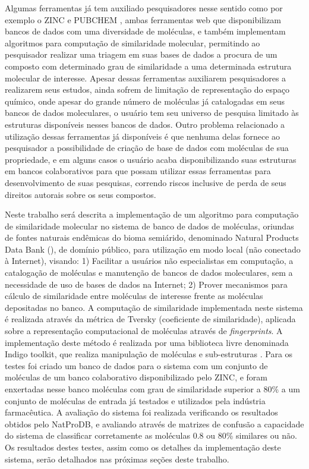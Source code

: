 Algumas ferramentas já tem auxiliado pesquisadores nesse sentido como por exemplo o ZINC \cite{irwin2005zinc} e PUBCHEM \cite{li2010pubchem}, ambas ferramentas web que disponibilizam bancos de dados com uma diversidade de moléculas, e também implementam algoritmos para computação de similaridade molecular, permitindo ao pesquisador realizar uma triagem em suas bases de dados a procura de um composto com determinado grau de similaridade a uma determinada estrutura molecular de interesse. Apesar dessas ferramentas auxiliarem pesquisadores a realizarem seus estudos, ainda sofrem de limitação de representação do espaço químico, onde apesar do grande número de moléculas já catalogadas em seus bancos de dados moleculares, o usuário tem seu universo de pesquisa limitado às estruturas disponíveis nesses bancos de dados. Outro problema relacionado a utilização dessas ferramentas já disponíveis é que nenhuma delas fornece ao pesquisador a possibilidade de criação de base de dados com moléculas de sua propriedade, e em alguns casos o usuário acaba disponibilizando suas estruturas em bancos colaborativos para que possam utilizar essas ferramentas para desenvolvimento de suas pesquisas, correndo riscos inclusive de perda de seus direitos autorais sobre os  seus compostos.

Neste trabalho será descrita a implementação de um algoritmo para computação de similaridade molecular no sistema de banco de dados de moléculas, oriundas de fontes naturais endêmicas do bioma semiárido, denominado Natural Products Data Bank (), de domínio público, para utilização em modo local (não conectado à Internet), visando: 1) Facilitar a usuários não especialistas em computação, a catalogação de moléculas e manutenção de bancos de dados moleculares, sem a necessidade de uso de bases de dados na Internet; 2) Prover mecanismos para cálculo de similaridade entre moléculas de interesse frente as moléculas depositadas no banco. A computação de similaridade implementada neste sistema é realizada através da métrica de Tversky (coeficiente de similaridade), aplicada sobre a representação computacional de moléculas através de \textit{fingerprints}. A implementação deste método é realizada por uma biblioteca livre denominada Indigo toolkit, que realiza manipulação de moléculas e sub-estruturas \cite{pavlov2011indigo}. Para os testes foi criado um banco de dados para o sistema com um conjunto de moléculas de um banco colaborativo disponibilizado pelo ZINC, e foram enxertadas nesse banco moléculas com grau de similaridade superior a 80\% a um conjunto de moléculas de entrada já testados e utilizados pela indústria farmacêutica. A avaliação do sistema foi realizada verificando os resultados obtidos pelo NatProDB, e avaliando através de matrizes de confusão a capacidade do sistema de classificar corretamente as moléculas 0.8 ou 80\% similares ou não. Os resultados destes testes, assim como os detalhes da implementação deste sistema, serão detalhados nas próximas seções deste trabalho.


